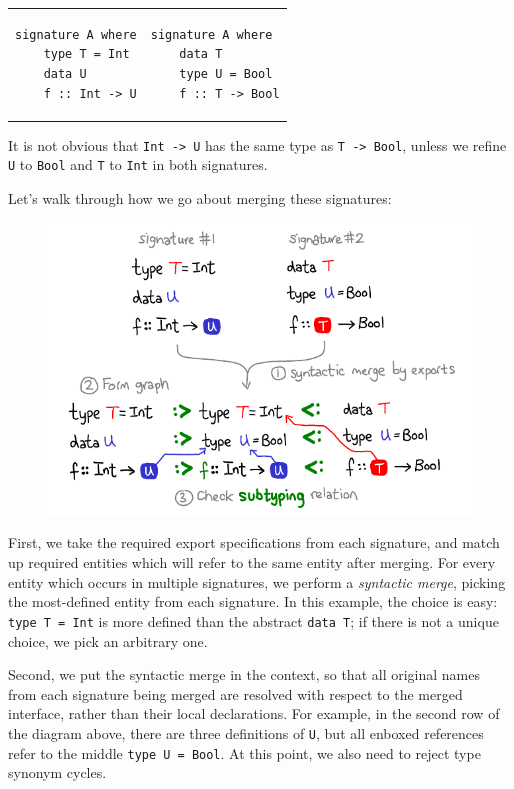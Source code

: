 \begin{tabular}{p{} p{}}
\begin{lstlisting}
signature A where
    type T = Int
    data U
    f :: Int -> U
\end{lstlisting}
&
\begin{lstlisting}
signature A where
    data T
    type U = Bool
    f :: T -> Bool
\end{lstlisting}
\end{tabular}

\noindent
It is not obvious that \verb|Int -> U| has the same type as \verb|T -> Bool|,
unless we refine \verb|U| to \verb|Bool| and \verb|T| to \verb|Int| in
both signatures.

Let's walk through how we go about merging these signatures:

\begin{figure}[H]
\center\includegraphics{figures/signature-merging.pdf}
\end{figure}

First, we take the required export specifications from each signature, and
match up required entities which will refer to the same entity after
merging.  For every entity which occurs in multiple signatures,
we perform a \emph{syntactic merge}, picking the most-defined
entity from each signature.  In this example, the choice is easy:
\verb|type T = Int| is more defined than the abstract \verb|data T|;
if there is not a unique choice, we pick an arbitrary one.

Second, we put the syntactic merge in the context, so that all original
names from each signature being merged are resolved with respect to the
merged interface, rather than their local declarations.  For example, in
the second row of the diagram above, there are three definitions of
\verb|U|, but all enboxed references refer to the middle \verb|type U = Bool|.
At this point, we also need to reject type synonym cycles.

